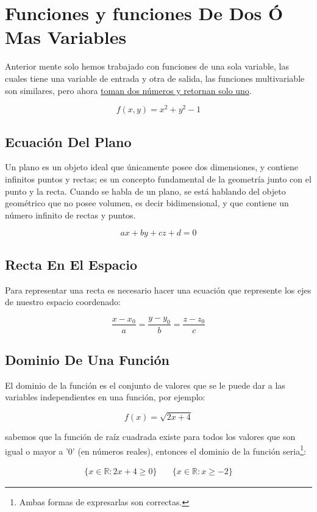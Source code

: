 \documentclass{article}
\begin{document}
\section{Funciones y funciones De Dos Ó Mas Variables}
\label{sec:orge074f03}
Anterior mente solo hemos trabajado con funciones de una sola variable, las cuales tiene una variable de entrada y otra de salida, las funciones multivariable son similares, pero ahora \uline{toman dos números y retornan solo uno}. 

\[
f(x,y) = x^2 + y^2 - 1
\]

\subsection{Ecuación Del Plano}
\label{sec:orga6a54aa}
Un plano es un objeto ideal que únicamente posee dos dimensiones, y contiene infinitos puntos y rectas; es un concepto fundamental de la geometría junto con el punto y la recta. Cuando se habla de un plano, se está hablando del objeto geométrico que no posee volumen, es decir bidimensional, y que contiene un número infinito de rectas y puntos. 

\[ax+by+cz+d=0\]

\subsection{Recta En El Espacio}
\label{sec:org6329bf0}
Para representar una recta es necesario hacer una ecuación que represente los ejes de nuestro espacio coordenado:

\[
\frac{x-x_0}{a} = \frac{y-y_0}{b} = \frac{z-z_0}{c}
\]

\subsection{Dominio De Una Función}
\label{sec:org0ad983f}
El dominio de la función es el conjunto de valores que se le puede dar a las variables independientes en una función, por ejemplo:

\[
f(x) = \sqrt{2x+4}
\]

sabemos que la función de raíz cuadrada existe para todos los valores que son igual o mayor a '0' (en números reales), entonces el dominio de la función seria\footnote{Ambas formas de expresarlas son correctas.}:

\[ \begin{aligned}
\{x\in\mathbb{R}:2x+4 \geq 0\} &~& \{x\in\mathbb{R}:x \geq -2\}
\end{aligned} \]
\end{document}
